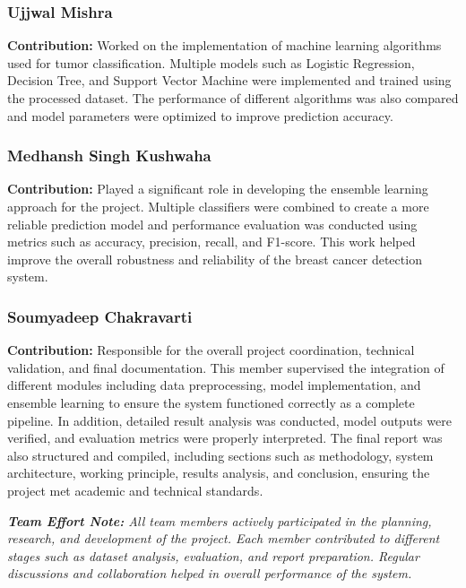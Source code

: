 \documentclass[12pt]{article}
\begin{document}
\subsubsection*{Ujjwal Mishra}
\textbf{Contribution:} Worked on the implementation of machine learning algorithms used for tumor classification. Multiple models such as Logistic Regression, Decision Tree, and Support Vector Machine were implemented and trained using the processed dataset. The performance of different algorithms was also compared and model parameters were optimized to improve prediction accuracy.

\subsubsection*{Medhansh Singh Kushwaha}
\textbf{Contribution:} Played a significant role in developing the ensemble learning approach for the project. Multiple classifiers were combined to create a more reliable prediction model and performance evaluation was conducted using metrics such as accuracy, precision, recall, and F1-score. This work helped improve the overall robustness and reliability of the breast cancer detection system.

\subsubsection*{Soumyadeep Chakravarti}
\textbf{Contribution:} Responsible for the overall project coordination, technical validation, and final documentation. This member supervised the integration of different modules including data preprocessing, model implementation, and ensemble learning to ensure the system functioned correctly as a complete pipeline. In addition, detailed result analysis was conducted, model outputs were verified, and evaluation metrics were properly interpreted. The final report was also structured and compiled, including sections such as methodology, system architecture, working principle, results analysis, and conclusion, ensuring the project met academic and technical standards.

\vspace{0.5cm}

\noindent \textit{\textbf{Team Effort Note:} All team members actively participated in the planning, research, and development of the project. Each member contributed to different stages such as dataset analysis, evaluation, and report preparation. Regular discussions and collaboration helped in overall performance of the system.}
\end{document}
